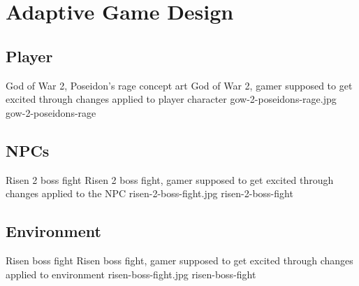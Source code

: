 \section{Adaptive Game Design}
\subsection{Player}

\img
{God of War 2, Poseidon's rage concept art}
{God of War 2, gamer supposed to get excited through changes applied to player character}
{gow-2-poseidons-rage.jpg}
{gow-2-poseidons-rage}

\subsection{NPCs}

\img
{Risen 2 boss fight}
{Risen 2 boss fight, gamer supposed to get excited through changes applied to the NPC}
{risen-2-boss-fight.jpg}
{risen-2-boss-fight}

\subsection{Environment}

\img
{Risen boss fight}
{Risen boss fight, gamer supposed to get excited through changes applied to environment}
{risen-boss-fight.jpg}
{risen-boss-fight}


